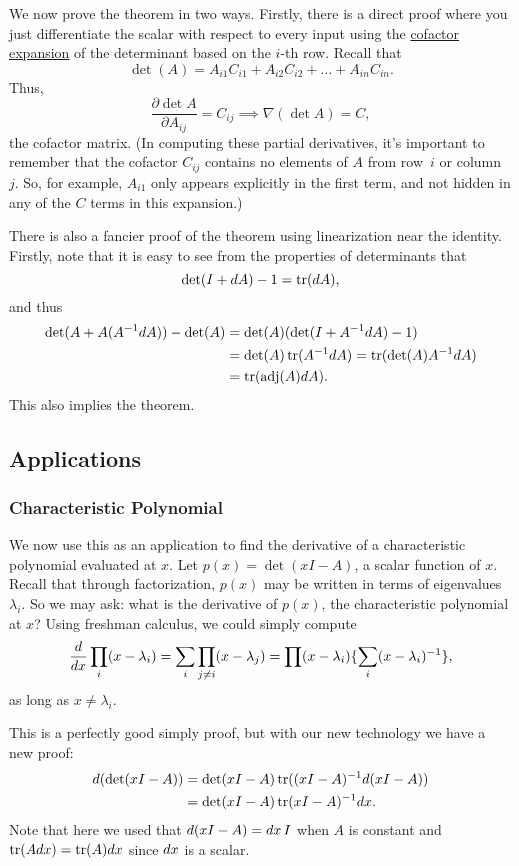 We now prove the theorem in two ways. Firstly, there is a direct proof where you just differentiate the scalar with respect to every input using the \href{https://en.wikipedia.org/wiki/Laplace_expansion}{cofactor expansion} of the determinant based on the $i$-th row. Recall that 
\[
\det (A) = A_{i1} C_{i1} +A_{i2} C_{i2} + \dots + A_{in} C_{in}.
\]
Thus, 
\[
\frac{\partial \det A}{ \partial A_{ij}} = C_{ij} \implies \nabla (\det A) = C, 
\]
the cofactor matrix.  (In computing these partial derivatives, it's important to remember that the cofactor $C_{ij}$ contains no elements of $A$ from row~$i$ or column~$j$.  So, for example, $A_{i1}$ only appears explicitly in the first term, and not hidden in any of the $C$ terms in this expansion.)

There is also a fancier proof of the theorem using linearization near the identity. Firstly, note that it is easy to see from the properties of determinants that $$\det(I + d A) - 1 = \operatorname{tr}(d A),$$ and thus 
\begin{align*}
    \det(A + A(A^{-1} d A)) - \det (A) &= \det(A) (\det (I + A^{-1} d A) - 1) \\
    &= \det(A) \operatorname{tr}(A^{-1} d A) = \operatorname{tr}(\det (A) A^{-1} d A) \\
    &= \operatorname{tr}(\operatorname{adj}(A) d A).
\end{align*}
This also implies the theorem.

\subsection{Applications}
\subsubsection{Characteristic Polynomial}

We now use this as an application to find the derivative of a characteristic polynomial evaluated at $x$. Let $p(x) = \det(xI -A)$, a scalar function of $x$. Recall that through factorization, $p(x)$ may be written in terms of eigenvalues $\lambda_i$. So we may ask: what is the derivative of $p(x)$, the characteristic polynomial at $x$? Using freshman calculus, we could simply compute 
\[
\frac{d}{d x} \prod_i (x-\lambda_i) = \sum_i \prod_{j\neq i} (x-\lambda_j)  = \prod (x-\lambda_i) \{\sum_i (x- \lambda_i)^{-1}\},
\]
as long as $x \neq \lambda_i$.

This is a perfectly good simply proof, but with our new technology we have a new proof:
\begin{align*}
    d (\det (x I - A)) &= \det(x I - A) \operatorname{tr}((xI - A)^{-1} d (x I - A)) \\
    &= \det(xI - A) \operatorname{tr}(x I - A)^{-1} d x.
\end{align*}
Note that here we used that $d (x I - A) = d x \, I$ when $A$ is constant and $\operatorname{tr} (A d x) = \operatorname{tr}(A) d x$ since $d x$ is a scalar.

